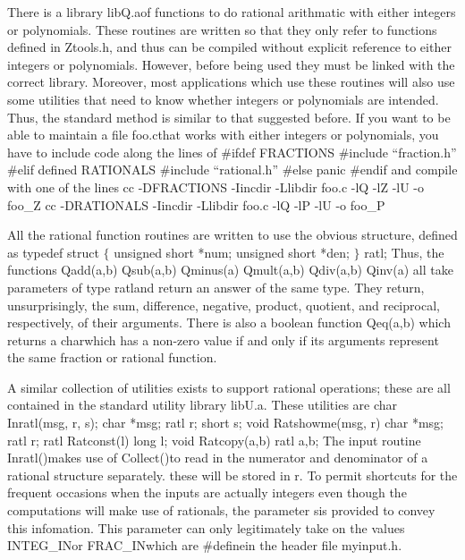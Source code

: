 There is a library \*libQ.a\@ of functions to do rational arithmatic
with either 
integers or polynomials. These routines are written so that they only
refer to functions defined in \*Ztools.h\@, and thus can be compiled
without explicit reference to either integers or polynomials. However,
before being used they must be linked with the correct library.
Moreover, most applications which use these routines will also use
some utilities that need to know whether integers or polynomials are
intended. Thus, the standard method is similar to that suggested
before. If you want to be able to maintain a file \*foo.c\@ that works
with either integers or polynomials, you have to include code along
the lines of
\*\obeylines
\#ifdef FRACTIONS
\#include ``fraction.h''
\#elif defined RATIONALS
\#include ``rational.h''
\#else
panic
\#endif
\@
\smallskip
\noindent and compile with one of the lines 
\smallskip
\*\obeylines
cc -DFRACTIONS -Iincdir -Llibdir foo.c -lQ -lZ -lU -o foo\_Z
cc -DRATIONALS -Iincdir -Llibdir foo.c -lQ -lP -lU -o foo\_P
\@
\smallskip

\noindent All the rational function routines are written to use the
obvious structure, defined as 
\*\obeylines
typedef struct $\{$
\qquad unsigned short *num;
\qquad unsigned short *den;
$\}$ ratl;
\@
\smallskip\noindent Thus, the functions 
\smallskip
\*\obeylines
Qadd(a,b)
Qsub(a,b)
Qminus(a)
Qmult(a,b)
Qdiv(a,b)
Qinv(a)
\@
\smallskip\noindent all take parameters of type \*ratl\@ and return an
answer of the same type. They return, unsurprisingly, the sum,
difference, negative, product, quotient, and reciprocal, respectively,
of their arguments. There is also a boolean function \*Qeq(a,b)\@
which returns a \*char\@ which has a non-zero value if and only if its
arguments represent the same fraction or rational function.

A similar collection of utilities exists to support rational
operations; these are all contained in the standard utility library
\*libU.a\@. These utilities are
\smallskip\*\obeylines
char Inratl(msg, r, s);
char *msg;
ratl r;
short s;
\qquad
void Ratshowme(msg, r)
char *msg;
ratl r;
\qquad
ratl Ratconst(l)
long l;
\qquad
void Ratcopy(a,b)
ratl a,b;
\@
\medskip
The input routine \*Inratl()\@ makes use of \*Collect()\@ to read in
the numerator and denominator of a rational structure separately.
these will be stored in \*r\@. To permit shortcuts for the frequent
occasions when the inputs are actually integers even though the
computations will make use of rationals, the parameter \*s\@ is
provided to convey this infomation. This parameter can only
legitimately take on the values \*INTEG\_IN\@ or \*FRAC\_IN\@ which are
\*\#define\@d in the header file \*myinput.h\@.

